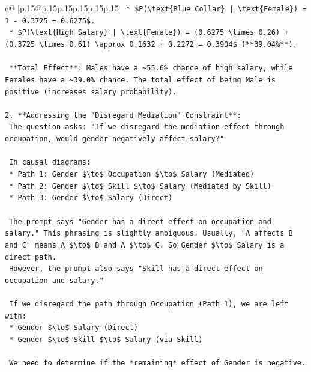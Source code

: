 \documentclass{article}
\begin{document}
{\begin{supertabular}{c@{$\;$}|p{.15\linewidth}@{}p{.15\linewidth}p{.15\linewidth}p{.15\linewidth}p{.15\linewidth}p{.15\linewidth}}
{{{\texttt{        *   \$P(\textbackslash{}text\{Blue Collar\} | \textbackslash{}text\{Female\}) = 1 {-} 0.3725 = 0.6275\$.} \\
\texttt{        *   \$P(\textbackslash{}text\{High Salary\} | \textbackslash{}text\{Female\}) = (0.6275 \textbackslash{}times 0.26) + (0.3725 \textbackslash{}times 0.61) \textbackslash{}approx 0.1632 + 0.2272 = 0.3904\$ (**39.04\%**).} \\
\\ 
\texttt{    **Total Effect**: Males have a \textasciitilde{}55.6\% chance of high salary, while Females have a \textasciitilde{}39.0\% chance. The total effect of being Male is positive (increases salary probability).} \\
\\ 
\texttt{2.  **Addressing the "Disregard Mediation" Constraint**:} \\
\texttt{    The question asks: "If we disregard the mediation effect through occupation, would gender negatively affect salary?"} \\
\\ 
\texttt{    In causal diagrams:} \\
\texttt{    *   Path 1: Gender \$\textbackslash{}to\$ Occupation \$\textbackslash{}to\$ Salary (Mediated)} \\
\texttt{    *   Path 2: Gender \$\textbackslash{}to\$ Skill \$\textbackslash{}to\$ Salary (Mediated by Skill)} \\
\texttt{    *   Path 3: Gender \$\textbackslash{}to\$ Salary (Direct)} \\
\\ 
\texttt{    The prompt says "Gender has a direct effect on occupation and salary." This phrasing is slightly ambiguous. Usually, "A affects B and C" means A \$\textbackslash{}to\$ B and A \$\textbackslash{}to\$ C. So Gender \$\textbackslash{}to\$ Salary is a direct path.} \\
\texttt{    However, the prompt also says "Skill has a direct effect on occupation and salary."} \\
\\ 
\texttt{    If we disregard the path through Occupation (Path 1), we are left with:} \\
\texttt{    *   Gender \$\textbackslash{}to\$ Salary (Direct)} \\
\texttt{    *   Gender \$\textbackslash{}to\$ Skill \$\textbackslash{}to\$ Salary (via Skill)} \\
\\ 
\texttt{    We need to determine if the *remaining* effect of Gender is negative.} \\
}}}
\end{supertabular}}
\end{document}
